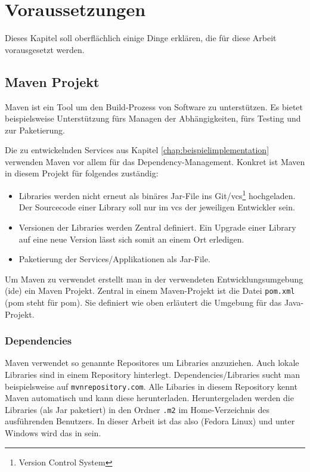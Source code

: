 \chapter{Voraussetzungen}
\label{chap:voraussetzungen}
Dieses Kapitel soll oberflächlich einige Dinge erklären, die für diese Arbeit vorausgesetzt werden.
\section{Maven Projekt}
\label{chap:maven}
Maven ist ein Tool um den Build-Prozess von Software zu unterstützen. Es bietet beispielsweise Unterstützung fürs Managen der Abhängigkeiten, fürs Testing und zur Paketierung.

Die zu entwickelnden Services aus Kapitel \ref{chap:beispielimplementation} verwenden Maven vor allem für das Dependency-Management. Konkret ist Maven in diesem Projekt für folgendes zuständig:
\begin{itemize}
	\item
	Libraries werden nicht erneut als binäres Jar-File ins Git/\acrshort{vcs}\footnote{Version Control System} hochgeladen. Der Sourcecode einer Library soll nur im \acrshort{vcs} der jeweiligen Entwickler sein.
	\item
	Versionen der Libraries werden Zentral definiert. Ein Upgrade einer Library auf eine neue Version lässt sich somit an einem Ort erledigen.
	\item
	Paketierung der Services/Applikationen als Jar-File.
\end{itemize}
Um Maven zu verwendet erstellt man in der verwendeten Entwicklungsumgebung (\acrshort{ide}) ein Maven Projekt. Zentral in einem Maven-Projekt ist die Datei \texttt{pom.xml} (\acrshort{pom} steht für \acrlong{pom}). Sie definiert wie oben erläutert die Umgebung für das Java-Projekt.

\subsection{Dependencies}
Maven verwendet so genannte Repositores um Libraries anzuziehen. Auch lokale Libraries sind in einem Repository hinterlegt. Dependencies/Libraries sucht man beispielsweise auf \texttt{mvnrepository.com}. Alle Libaries in diesem Repository kennt Maven automatisch und kann diese herunterladen. Heruntergeladen werden die Libraries (als Jar paketiert) in den Ordner \texttt{.m2} im Home-Verzeichnis des ausführenden Benutzers. In dieser Arbeit ist das also  (Fedora Linux) und unter Windows wird das in  sein.

